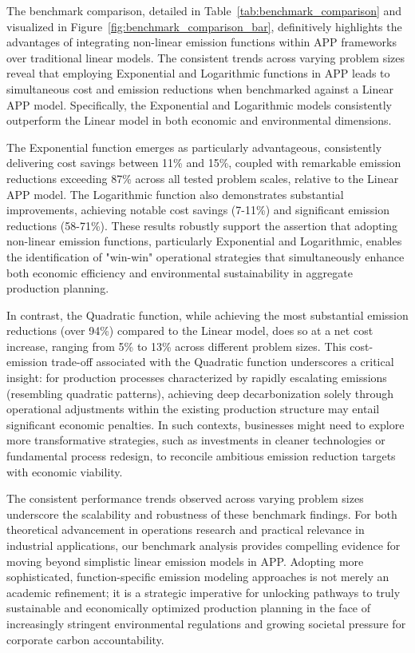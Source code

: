 \begin{table}[htbp]
\begin{table}[htbp]
\begin{table}[htbp]
The benchmark comparison, detailed in Table~\ref{tab:benchmark_comparison} and visualized in Figure~\ref{fig:benchmark_comparison_bar}, definitively highlights the advantages of integrating non-linear emission functions within APP frameworks over traditional linear models.  The consistent trends across varying problem sizes reveal that employing Exponential and Logarithmic functions in APP leads to simultaneous cost and emission reductions when benchmarked against a Linear APP model.  Specifically, the Exponential and Logarithmic models consistently outperform the Linear model in both economic and environmental dimensions.

The Exponential function emerges as particularly advantageous, consistently delivering cost savings between 11\% and 15\%, coupled with remarkable emission reductions exceeding 87\% across all tested problem scales, relative to the Linear APP model.  The Logarithmic function also demonstrates substantial improvements, achieving notable cost savings (7-11\%) and significant emission reductions (58-71\%).  These results robustly support the assertion that adopting non-linear emission functions, particularly Exponential and Logarithmic, enables the identification of "win-win" operational strategies that simultaneously enhance both economic efficiency and environmental sustainability in aggregate production planning.

In contrast, the Quadratic function, while achieving the most substantial emission reductions (over 94\%) compared to the Linear model, does so at a net cost increase, ranging from 5\% to 13\% across different problem sizes.  This cost-emission trade-off associated with the Quadratic function underscores a critical insight: for production processes characterized by rapidly escalating emissions (resembling quadratic patterns), achieving deep decarbonization solely through operational adjustments within the existing production structure may entail significant economic penalties. In such contexts, businesses might need to explore more transformative strategies, such as investments in cleaner technologies or fundamental process redesign, to reconcile ambitious emission reduction targets with economic viability.

The consistent performance trends observed across varying problem sizes underscore the scalability and robustness of these benchmark findings.  For both theoretical advancement in operations research and practical relevance in industrial applications, our benchmark analysis provides compelling evidence for moving beyond simplistic linear emission models in APP.  Adopting more sophisticated, function-specific emission modeling approaches is not merely an academic refinement; it is a strategic imperative for unlocking pathways to truly sustainable and economically optimized production planning in the face of increasingly stringent environmental regulations and growing societal pressure for corporate carbon accountability.


\end{table}
\end{table}
\end{table}
